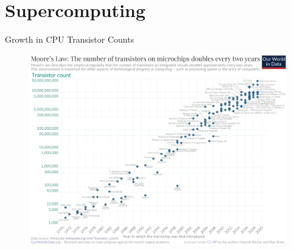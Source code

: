 \section{Supercomputing}


\begin{frame}{Growth in CPU Transistor Counts}
\begin{figure}
  \centering
  \includegraphics[width=0.65\linewidth]{figures/cpu_transistor_counts.png}
\end{figure}
\end{frame}


